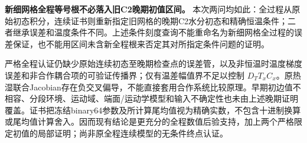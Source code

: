 \textbf{新细网格全程等号根不必落入旧C2晚期初值区间。} 本次两问均如此：全过程从原始初态积分，连续证书则重新指定旧网格的晚期C2水分初态和精确恒温条件；二者继承误差和温度条件不同。上述条件刻度查询不能重命名为新细网格全过程的误差保证，也不能用区间未含新全程根来否定其对所指定条件问题的证明。

严格全程认证仍缺少原始连续初态至晚期检查点的误差管，以及非恒温时温度梯度误差和非合作耦合项的可验证传播界；仅有温差幅值界不足以控制 $D_T T_x C_x$。原热湿联合Jacobian存在负交叉偏导，不能直接套用合作系统比较原理。早期初边值不相容、分段环境、运动域、端面/运动学模型和输入不确定性也未由上述晚期证明覆盖。证书把冻结binary64参数及所计算尾均值视为精确实数，不包含十进制换算或尾均值计算舍入。因而现有结论是更充分的全程数值后验支持，加上两个严格限定初值的局部证明；尚非原全程连续模型的无条件终点认证。

